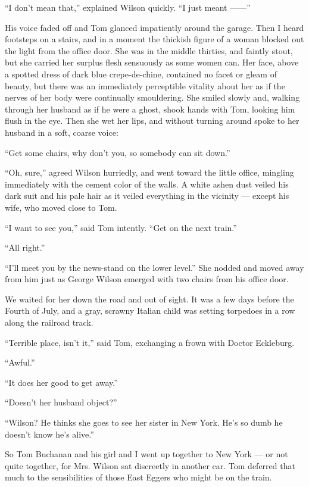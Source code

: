 \documentclass{znotebook}
\begin{document}
``I don't mean that,'' explained Wilson quickly. ``I just meant ——''

His voice faded off and Tom glanced impatiently around the garage. Then I heard footsteps on a stairs, and in a moment the thickish figure of a woman blocked out the light from the office door. She was in the middle thirties, and faintly stout, but she carried her surplus flesh sensuously as some women can. Her face, above a spotted dress of dark blue crepe-de-chine, contained no facet or gleam of beauty, but there was an immediately perceptible vitality about her as if the nerves of her body were continually smouldering. She smiled slowly and, walking through her husband as if he were a ghost, shook hands with Tom, looking him flush in the eye. Then she wet her lips, and without turning around spoke to her husband in a soft, coarse voice:

``Get some chairs, why don't you, so somebody can sit down.''

``Oh, sure,'' agreed Wilson hurriedly, and went toward the little office, mingling immediately with the cement color of the walls. A white ashen dust veiled his dark suit and his pale hair as it veiled everything in the vicinity — except his wife, who moved close to Tom.

``I want to see you,'' said Tom intently. ``Get on the next train.''

``All right.''

``I'll meet you by the news-stand on the lower level.'' She nodded and moved away from him just as George Wilson emerged with two chairs from his office door.

We waited for her down the road and out of sight. It was a few days before the Fourth of July, and a gray, scrawny Italian child was setting torpedoes in a row along the railroad track.

``Terrible place, isn't it,'' said Tom, exchanging a frown with Doctor Eckleburg.

``Awful.''

``It does her good to get away.''

``Doesn't her husband object?''

``Wilson? He thinks she goes to see her sister in New York. He's so dumb he doesn't know he's alive.''

So Tom Buchanan and his girl and I went up together to New York — or not quite together, for Mrs. Wilson sat discreetly in another car. Tom deferred that much to the sensibilities of those East Eggers who might be on the train.
\end{document}
